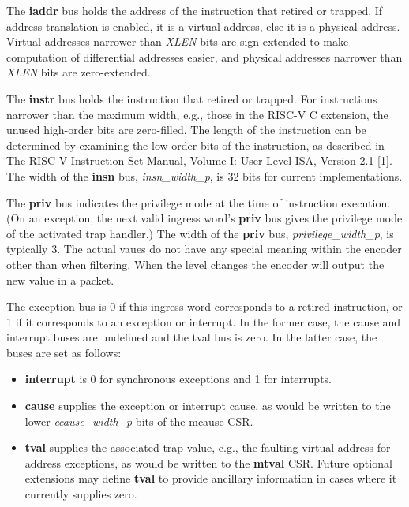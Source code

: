 The \textbf {iaddr} bus holds the address of the instruction that
retired or trapped. If address translation is enabled, it is a virtual
address, else it is a physical address. Virtual addresses narrower
than \textit {XLEN} bits are sign-extended to make computation of differential
addresses easier, and physical addresses narrower than \textit {XLEN} bits are
zero-extended.

The \textbf {instr} bus holds the instruction that retired or
trapped. For instructions narrower than the maximum width, e.g., those
in the RISC-V C extension, the unused high-order bits are
zero-filled. The length of the instruction can be determined by
examining the low-order bits of the instruction, as described in The
RISC-V Instruction Set Manual, Volume I: User-Level ISA, Version 2.1
[1]. The width of the \textbf {insn} bus, \textit {insn\_width\_p}, is 32 bits for current
implementations.

The \textbf {priv} bus indicates the privilege mode at the time of instruction
execution. (On an exception, the next valid ingress word's \textbf {priv} bus
gives the privilege mode of the activated trap handler.) The width of
the \textbf {priv} bus, \textit {privilege\_width\_p}, is typically 3. The actual vaues do not have any special meaning within the encoder other than when filtering. When the level changes the encoder will output the new value in a packet.

The exception bus is 0 if this ingress word corresponds to a retired
instruction, or 1 if it corresponds to an exception or interrupt.  In
the former case, the cause and interrupt buses are undefined and the
tval bus is zero.  In the latter case, the buses are set as
follows:

\begin{itemize}
  \item \textbf {interrupt} is 0 for synchronous exceptions and 1 for
    interrupts.
  \item \textbf {cause} supplies the exception or interrupt cause, as
    would be written to the lower \textit {ecause\_width\_p} bits of the mcause CSR.
  \item \textbf {tval} supplies the associated trap value, e.g., the
    faulting virtual address for address exceptions, as would be
    written to the \textbf {mtval} CSR. Future optional extensions may define \textbf {tval} to provide ancillary information in cases where it currently supplies zero.  
\end{itemize}

